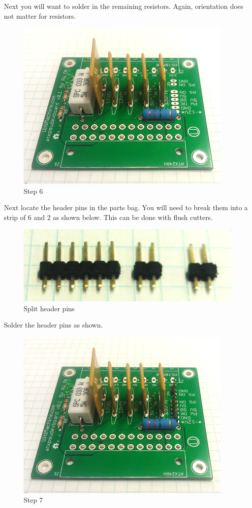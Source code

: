 Next you will want to solder in the remaining resistors. Again,
orientation does not matter for resistors.

\begin{figure}[htbp]
\centering
\includegraphics{./png/step-06.png}
\caption{Step 6}
\end{figure}

Next locate the header pins in the parts bag. You will need to break
them into a strip of 6 and 2 as shown below. This can be done with flush
cutters.

\begin{figure}[htbp]
\centering
\includegraphics{./png/header-break.png}
\caption{Split header pins}
\end{figure}

Solder the header pins as shown.

\begin{figure}[htbp]
\centering
\includegraphics{./png/step-07.png}
\caption{Step 7}
\end{figure}

